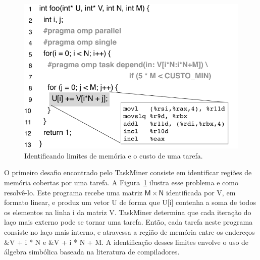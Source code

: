 \documentclass[sigplan,10pt,review]{acmart}
\newcommand\Taskminer{\mbox{\textsf{TaskMiner}}}
\begin{document}
\begin{figure}[b!]
\begin{center}
\includegraphics[width=1\columnwidth]{images/ex_Regions}
\caption{Identificando limites de memória e o custo de uma tarefa.}
\label{fig:ex_Regions}
\end{center}
\end{figure}

O primeiro desafio encontrado pelo \Taskminer{} consiste em 
identificar regiões de memória cobertas por uma tarefa.
A Figura~\ref{fig:ex_Regions} ilustra esse problema e como resolvê-lo. Este programa recebe
uma matriz $\mathsf{M}\times\mathsf{N}$ identificada por  \textsf{V}, em formato linear,
e produz um vetor  \textsf{U} de forma que  \textsf{U[i]} contenha a soma de todos
os elementos na linha  \textsf{i} da matriz  \textsf{V}. {\Taskminer} determina que cada
iteração do laço mais externo pode se tornar uma tarefa. Então, cada tarefa neste programa
consiste no laço mais interno, e atravessa a região de memória entre os endereços  \textsf{\&V + i * N} e
 \textsf{\&V + i * N + M}. A identificação desses limites envolve o uso de álgebra simbólica baseada
 na literatura de compiladores.
 
\end{document}
